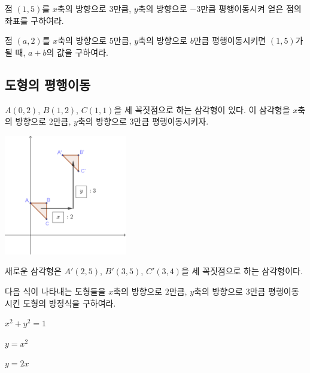 \documentclass{oblivoir}
\begin{document}
%
\prob{}\label{translate4}
점 \((1,5)\)를 \(x\)축의 방향으로 \(3\)만큼, \(y\)축의 방향으로 \(-3\)만큼 평행이동시켜 얻은 점의 좌표를 구하여라.

\prob{}\label{translate5}
점 \((a,2)\)를 \(x\)축의 방향으로 \(5\)만큼, \(y\)축의 방향으로 \(b\)만큼 평행이동시키면 \((1,5)\)가 될 때, \(a+b\)의 값을 구하여라.

\bigskip\bigskip\bigskip\bigskip
\subsection{도형의 평행이동}
%
\exam{}\label{ttranslate1}
\(A(0,2)\), \(B(1,2)\), \(C(1,1)\)을 세 꼭짓점으로 하는 삼각형이 있다.
이 삼각형을 \(x\)축의 방향으로 \(2\)만큼, \(y\)축의 방향으로 \(3\)만큼 평행이동시키자.
\begin{center}
\includegraphics[width=0.4\textwidth]{ttranslate_1}
\end{center}
새로운 삼각형은 \(A'(2,5)\), \(B'(3,5)\), \(C'(3,4)\)을 세 꼭짓점으로 하는 삼각형이다.

\newpage
%
\exam{}\label{ttranslate2}
다음 식이 나타내는 도형들을 \(x\)축의 방향으로 \(2\)만큼, \(y\)축의 방향으로 \(3\)만큼 평행이동시킨 도형의 방정식을 구하여라.
\par\noindent\medskip
\begin{enumerate*}[itemjoin={,\qquad\qquad}]
\item
\(x^2+y^2=1\)
\item
\(y=x^2\)
\item
\(y=2x\)
\end{enumerate*}
\end{document}
